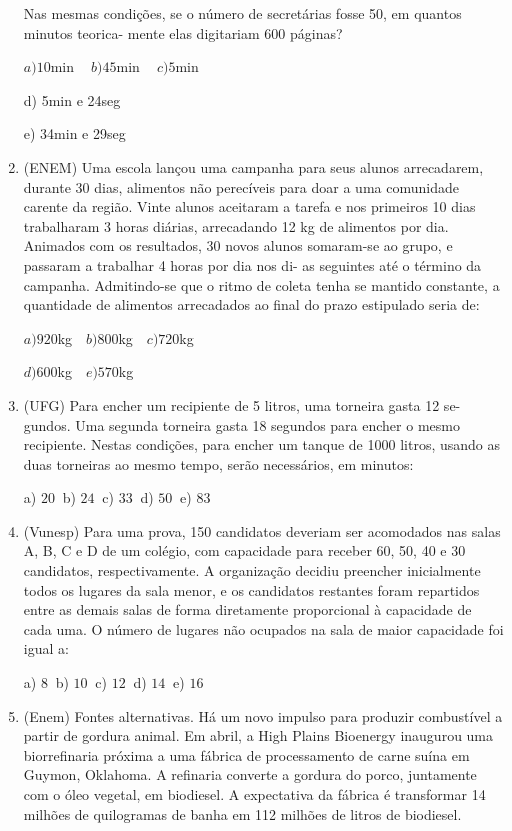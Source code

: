 \begin{multicols*}{2}
\begin{enumerate}
		      Nas mesmas condições, se o número de secretárias fosse 50, em quantos minutos teorica- mente elas digitariam 600 páginas?

		      $ a) 10$min $\ \ \ \ b) 45$min $\ \ \ \ c) 5$min

		      d) 5min e 24seg

		      e) 34min e 29seg

		\item (ENEM) Uma escola lançou uma campanha para seus alunos arrecadarem, durante 30 dias, alimentos não perecíveis para doar a uma comunidade carente da região. Vinte alunos aceitaram a tarefa e nos primeiros 10 dias trabalharam 3 horas diárias, arrecadando 12 kg de alimentos por dia. Animados com os resultados, 30 novos alunos somaram-se ao grupo, e passaram a trabalhar 4 horas por dia nos di- as seguintes até o término da campanha. Admitindo-se que o ritmo de coleta tenha se mantido constante, a quantidade de alimentos arrecadados ao final do prazo estipulado seria de:

		      $a)920$kg $ \ \ \ b)800$kg $ \ \ \ c)720$kg

		      $d)600$kg $ \ \ \ e)570$kg

		\item (UFG) Para encher um recipiente de 5 litros, uma torneira gasta 12 se- gundos. Uma segunda torneira gasta 18 segundos para encher o mesmo recipiente. Nestas condições, para encher um tanque de 1000 litros, usando as duas torneiras ao mesmo tempo, serão necessários, em minutos:

		      a) $20 \ $ b) $24 \ $ c) $33 \ $ d) $50 \ $ e) $83 $

		\item (Vunesp) Para uma prova, 150 candidatos deveriam ser acomodados nas salas A, B, C e D de um colégio, com capacidade para receber 60, 50, 40 e 30 candidatos, respectivamente. A organização decidiu preencher inicialmente todos os lugares da sala menor, e os candidatos restantes foram repartidos entre as demais salas de forma diretamente proporcional à capacidade de cada uma. O número de lugares não ocupados na sala de maior capacidade foi igual a:

		      a) $8 \ $ b) $10 \ $ c) $12 \ $ d) $14 \ $ e) $16 $

		\item (Enem) Fontes alternativas. Há um novo impulso para produzir combustível a partir de gordura animal. Em abril, a High Plains Bioenergy inaugurou uma biorrefinaria próxima a uma fábrica de processamento de carne suína em Guymon, Oklahoma. A refinaria converte a gordura do porco, juntamente com o óleo vegetal, em biodiesel. A expectativa da fábrica é transformar 14 milhões de quilogramas de banha em 112 milhões de litros de biodiesel.


\end{enumerate}
\end{multicols*}
